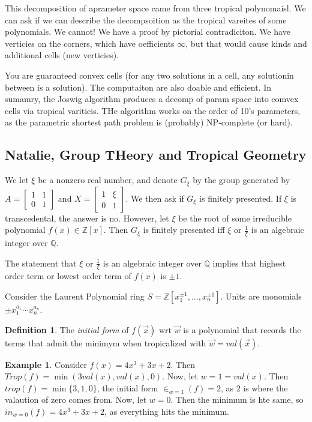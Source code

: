 \documentclass[11pt]{article}
\theoremstyle{definition}
\newtheorem{protoexample}{Example}[section]
\newenvironment{ex}
   {\begin{protoexample}}
   {\end{protoexample}}
\newtheorem{protodefinition}{Definition}[section]
\newenvironment{define}
   {\begin{protodefinition}}
   {\end{protodefinition}}
\def\ZZ{{\mathbb Z}}
\def\QQ{{\mathbb Q}}
\begin{document}
This decomposition of aprameter space came from three tropical polynomaisl. We can ask if we can describe the decompsoition as the tropical vareites of some polynomials. We cannot! We have a proof by pictorial contradiciton. We have verticies on the corners, which have oefficients $\infty$, but that would cause kinds and additional cells (new verticies).


You are guaranteed convex cells (for any two solutions in a cell, any solutionin between is a solution). The computaiton are also doable and efficient. In sumamry, the Joswig algorithm produces a decomp of param space into comvex cells via tropical varitieis. THe algorithm works on the order of 10's parameters, as the parametric shortest path problem is (probably) NP-complete (or hard).




\subsection{Natalie, Group THeory and Tropical Geometry}

We let $\xi$ be a nonzero real number, and denote $G_\xi$ by the group generated by $A = \begin{bmatrix}
    1 & 1 \\ 0 & 1
\end{bmatrix}$ and $X = \begin{bmatrix}
    1 & \xi \\ 0 & 1
\end{bmatrix}$. We then ask if $G_\xi$ is finitely presented. If $\xi$ is transcedental, the answer is no. However, let $\xi$ be the root of some irreducible polynomial $f(x)\in \ZZ[x]$. Then $G_\xi$ is finitely presented iff $\xi$ or $\frac{1}{\xi}$ is an algebraic integer over $\QQ$.

The statement that $\xi$ or $\frac{1}{\xi}$ is an algebraic integer over $\QQ$ implies that highest order term or lowest order term of $f(x)$ is $\pm 1$.


Consider the Laurent Polynomial ring $S = \ZZ[x_1^{\pm 1}, \dots, x_n^{\pm 1}]$. Units are monomials $\pm x_1^{a_1}\cdots x_n^{a_n}$.

\begin{define}
The \emph{initial form} of $f(\overrightarrow{x})$ wrt $\overrightarrow{w}$ is a polynomial that records the terms that admit the minimym when tropicalized with $\overrightarrow{w} =val(\overrightarrow{x})$.
\end{define}
\begin{ex}
    Consider $f(x) = 4x^3+3x+2$. Then $Trop(f) = \min(3val(x), val(x), 0)$. Now, let $w=1=val(x)$. Then $trop(f)=\min\{3,1,0\}$, the initial form $\in_{w=1}(f) = 2$, as $2$ is where the valaution of zero comes from. Now, let $w=0$. Then the minimum is hte same, so $in_{w=0}(f) = 4x^3+3x+2$, as everything hits the minimum.
\end{ex}
\end{document}
